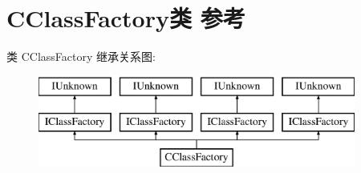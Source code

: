 \hypertarget{class_c_class_factory}{}\section{C\+Class\+Factory类 参考}
\label{class_c_class_factory}
类 C\+Class\+Factory 继承关系图\+:\begin{figure}[H]
\begin{center}
\leavevmode
\includegraphics[height=3.000000cm]{class_c_class_factory}
\end{center}
\end{figure}
